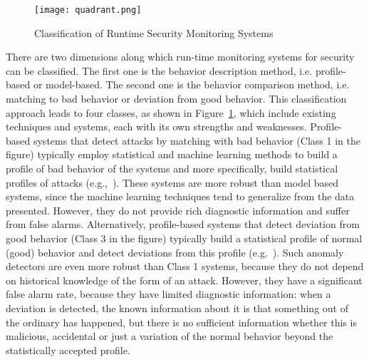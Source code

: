 \documentclass[conference]{IEEEtran}
\begin{document}
\begin{figure}
\centering
\texttt{[image: quadrant.png]}
\caption{Classification of Runtime Security Monitoring Systems}
\label{fig:quad}
\end{figure}


There are two dimensions along which run-time monitoring systems for
security can be classified. The first one is the behavior description
method, i.e. profile-based or model-based. The second one is the behavior comparison method, i.e. matching to bad behavior or deviation
from good behavior. This classification approach leads to four classes,
as shown in Figure~\ref{fig:quad}, which include existing techniques
and systems, each with its own strengths and weaknesses.
Profile-based systems that detect attacks by matching with bad behavior (Class 1
in the figure) typically employ statistical and machine learning 
methods to build a profile of bad behavior of the systems and more
specifically, build statistical profiles of attacks (e.g.,~\cite{Hodge:2004, Valdes:2000}). These systems are more robust than 
model based systems, since the machine learning techniques tend to
generalize from the data presented. However, they do not provide rich diagnostic information and suffer from false alarms.
Alternatively, profile-based systems that detect deviation from good
behavior (Class 3 in the figure) typically build a statistical profile
of normal (good) behavior and detect deviations from this profile (e.g.~\cite{Kim:2004, Lakhina:2005}). Such anomaly detectors are even more
robust than Class 1 systems, because they do not depend on historical
knowledge of the form of an attack. However, they have a significant
false alarm rate, because they have limited diagnostic information:
when a deviation is detected, the known information about it is that
something out of the ordinary has happened, but there is no sufficient
information whether this is malicious, accidental or just a variation
of the normal behavior beyond the statistically accepted profile.
\end{document}
